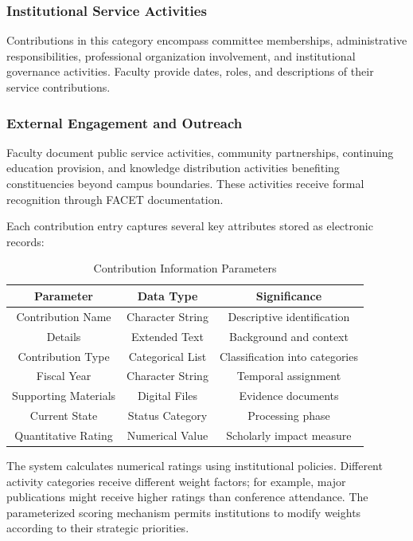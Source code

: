 \documentclass[conference]{IEEEtran}
\begin{document}
\subsubsection{Institutional Service Activities}
Contributions in this category encompass committee memberships, administrative responsibilities, professional organization involvement, and institutional governance activities. Faculty provide dates, roles, and descriptions of their service contributions.

\subsubsection{External Engagement and Outreach}
Faculty document public service activities, community partnerships, continuing education provision, and knowledge distribution activities benefiting constituencies beyond campus boundaries. These activities receive formal recognition through FACET documentation.

Each contribution entry captures several key attributes stored as electronic records:

\begin{table}[!h]
\centering
\caption{Contribution Information Parameters}
\label{table:contrib}
\begin{tabular}{|c|c|c|}
\hline
\textbf{Parameter} & \textbf{Data Type} & \textbf{Significance} \\
\hline
Contribution Name & Character String & Descriptive identification \\
Details & Extended Text & Background and context \\
Contribution Type & Categorical List & Classification into categories \\
Fiscal Year & Character String & Temporal assignment \\
Supporting Materials & Digital Files & Evidence documents \\
Current State & Status Category & Processing phase \\
Quantitative Rating & Numerical Value & Scholarly impact measure \\
\hline
\end{tabular}
\end{table}

The system calculates numerical ratings using institutional policies. Different activity categories receive different weight factors; for example, major publications might receive higher ratings than conference attendance. The parameterized scoring mechanism permits institutions to modify weights according to their strategic priorities.
\end{document}
